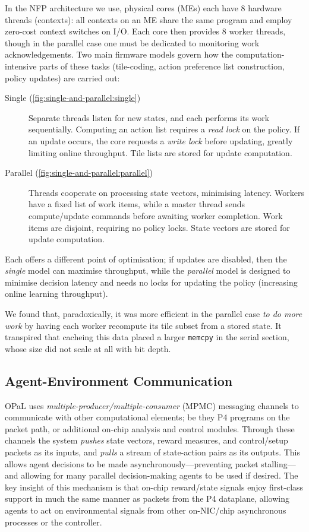 \documentclass[sigconf,natbib=false]{acmart}
\newcommand{\approachshort}{OPaL}
\begin{document}
In the NFP architecture we use, physical cores (MEs) each have 8 hardware threads (contexts): all contexts on an ME share the same program and employ zero-cost context switches on I/O.
Each core then provides 8 worker threads, though in the parallel case one must be dedicated to monitoring work acknowledgements.
Two main firmware models govern how the computation-intensive parts of these tasks (tile-coding, action preference list construction, policy updates) are carried out:
\begin{description}
	\item[Single (\cref{fig:single-and-parallel:single})] Separate threads listen for new states, and each performs its work sequentially. Computing an action list requires a \emph{read lock} on the policy. If an update occurs, the core requests a \emph{write lock} before updating, greatly limiting online throughput. Tile lists are stored for update computation.
	\item[Parallel (\cref{fig:single-and-parallel:parallel})] Threads cooperate on processing state vectors, minimising latency. Workers have a fixed list of work items, while a master thread sends compute/update commands before awaiting worker completion. Work items are disjoint, requiring no policy locks. State vectors are stored for update computation.
\end{description}
Each offers a different point of optimisation; if updates are disabled, then the \emph{single} model can maximise throughput, while the \emph{parallel} model is designed to minimise decision latency and needs no locks for updating the policy (increasing online learning throughput).

We found that, paradoxically, it was more efficient in the parallel case \emph{to do more work} by having each worker recompute its tile subset from a stored state.
It transpired that cacheing this data placed a larger \texttt{memcpy} in the serial section, whose size did not scale at all with bit depth.

\subsection{Agent-Environment Communication}\label{sec:agent-environment-communication}
\approachshort{} uses \emph{multiple-producer/multiple-consumer} (MPMC) messaging channels to communicate with other computational elements; be they P4 programs on the packet path, or additional on-chip analysis and control modules.
Through these channels the system \emph{pushes} state vectors, reward measures, and control/setup packets as its inputs, and \emph{pulls} a stream of state-action pairs as its outputs.
This allows agent decisions to be made asynchronously---preventing packet stalling---and allowing for many parallel decision-making agents to be used if desired.
The key insight of this mechanism is that on-chip reward/state signals enjoy first-class support in much the same manner as packets from the P4 dataplane, allowing agents to act on environmental signals from other on-NIC/chip asynchronous processes or the controller.
\end{document}
